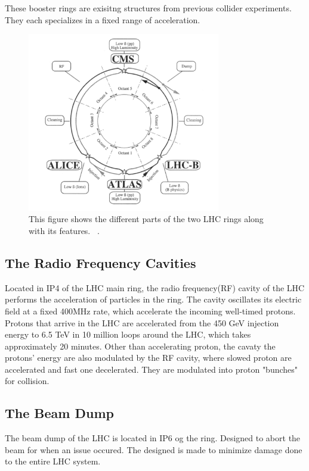 These booster rings are exisitng structures from previous collider experiments. They each specializes in a fixed range of acceleration. 

\begin{figure}[!htb]
    \begin{center}
        \includegraphics[width=0.75\textwidth]{figures/chapter_ATLAS/LHCRing}
        \caption{
			This figure shows the different parts of the two LHC rings along with its features. ~\cite{Pettersson:291782}.
        }
        \label{fig:perterson}
    \end{center}
\end{figure}

\subsection{The Radio Frequency Cavities}
Located in IP4 of the LHC main ring, the radio frequency(RF) cavity of the LHC performs the acceleration of particles in the ring. The cavity oscillates its electric field at a fixed 400MHz rate, which accelerate the incoming well-timed protons. Protons that arrive in the LHC are accelerated from the 450 GeV injection energy to 6.5 TeV in 10 million loops around the LHC, which takes approximately 20 minutes. Other than accelerating proton, the cavaty the protons'
energy are also modulated by the RF cavity, where slowed proton are accelerated and fast one decelerated. They are modulated into proton "bunches" for collision. 

\subsection{The Beam Dump}
The beam dump of the LHC is located in IP6 og the ring. Designed to abort the beam for when an issue occured. The designed is made to minimize damage done to the entire LHC system. 

